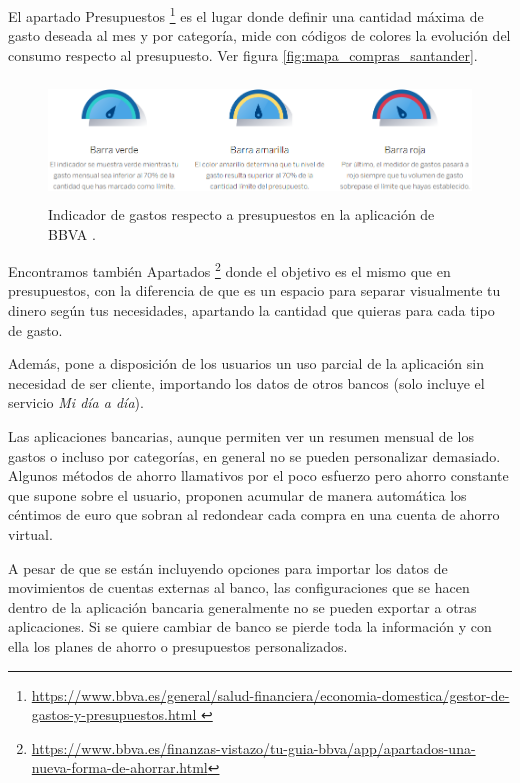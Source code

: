 \begin{itemize}
    El apartado Presupuestos \footnote{\url{https://www.bbva.es/general/salud-financiera/economia-domestica/gestor-de-gastos-y-presupuestos.html }} 
    es el lugar donde definir una cantidad máxima de gasto deseada 
    al mes y por categoría, mide con códigos de colores la evolución del consumo 
    respecto al presupuesto. Ver figura \ref{fig:mapa_compras_santander}.
    
    \begin{figure}[ht!]
    \centering
    \includegraphics[height = 32mm]{imagenes/indicador_presupuestos_BBVA.png}
    \caption{Indicador de gastos respecto a presupuestos en la aplicación de BBVA
    \cite{presupuestos-BBVA}.}
    \label{fig:indicador_presupuestos_BBVA}
    \end{figure}

    Encontramos también Apartados 
    \footnote{\url{https://www.bbva.es/finanzas-vistazo/tu-guia-bbva/app/apartados-una-nueva-forma-de-ahorrar.html}}
    donde el objetivo es el mismo que en presupuestos, con la diferencia de 
    que es un espacio para separar visualmente tu dinero según tus necesidades,
    apartando la cantidad que quieras para cada tipo de gasto.

    Además, pone a disposición de los usuarios un uso parcial de la aplicación sin necesidad 
    de ser cliente, importando los datos de otros bancos (solo incluye el 
    servicio \textit{Mi día a día}).

\end{itemize}

Las aplicaciones bancarias, aunque permiten ver un resumen mensual de los gastos o 
incluso por categorías, en general no se pueden personalizar demasiado. Algunos 
métodos de ahorro llamativos por el poco esfuerzo pero ahorro constante que supone sobre el 
usuario, proponen acumular de manera automática los céntimos de euro que sobran al 
redondear cada compra en una cuenta de ahorro virtual. 

A pesar de que se están incluyendo opciones para importar los datos de movimientos de 
cuentas externas al banco, las configuraciones que se hacen dentro de 
la aplicación bancaria generalmente no se pueden exportar a otras aplicaciones.
Si se quiere cambiar de banco se pierde toda la información 
y con ella los planes de ahorro o presupuestos personalizados.

